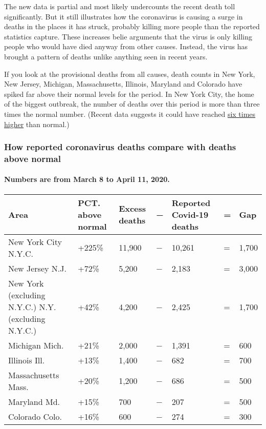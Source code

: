 The new data is partial and most likely undercounts the recent death
toll significantly. But it still illustrates how the coronavirus is
causing a surge in deaths in the places it has struck, probably killing
more people than the reported statistics capture. These increases belie
arguments that the virus is only killing people who would have died
anyway from other causes. Instead, the virus has brought a pattern of
deaths unlike anything seen in recent years.

If you look at the provisional deaths from all causes, death counts in
New York, New Jersey, Michigan, Massachusetts, Illinois, Maryland and
Colorado have spiked far above their normal levels for the period. In
New York City, the home of the biggest outbreak, the number of deaths
over this period is more than three times the normal number. (Recent
data suggests it could have reached
\href{https://www.nytimes3xbfgragh.onion/interactive/2020/04/27/upshot/coronavirus-deaths-new-york-city.html}{six
times higher} than normal.)

\hypertarget{how-reported-coronavirus-deaths-compare-with-deaths-above-normal}{%
\subsubsection{How reported coronavirus deaths compare with deaths above
normal}\label{how-reported-coronavirus-deaths-compare-with-deaths-above-normal}}

\hypertarget{numbers-are-from-march-8-to-april-11-2020}{%
\paragraph{Numbers are from March 8 to April 11,
2020.}\label{numbers-are-from-march-8-to-april-11-2020}}

\begin{longtable}[]{@{}lllllll@{}}
\toprule
Area & PCT. above normal & Excess deaths & − & Reported Covid-19 deaths
& = & Gap\tabularnewline
\midrule
\endhead
New York City N.Y.C. & +225\% & 11,900 & − & 10,261 & = &
1,700\tabularnewline
New Jersey N.J. & +72\% & 5,200 & − & 2,183 & = & 3,000\tabularnewline
New York (excluding N.Y.C.) N.Y. (excluding N.Y.C.) & +42\% & 4,200 & −
& 2,425 & = & 1,700\tabularnewline
Michigan Mich. & +21\% & 2,000 & − & 1,391 & = & 600\tabularnewline
Illinois Ill. & +13\% & 1,400 & − & 682 & = & 700\tabularnewline
Massachusetts Mass. & +20\% & 1,200 & − & 686 & = & 500\tabularnewline
Maryland Md. & +15\% & 700 & − & 207 & = & 500\tabularnewline
Colorado Colo. & +16\% & 600 & − & 274 & = & 300\tabularnewline
\bottomrule
\end{longtable}

